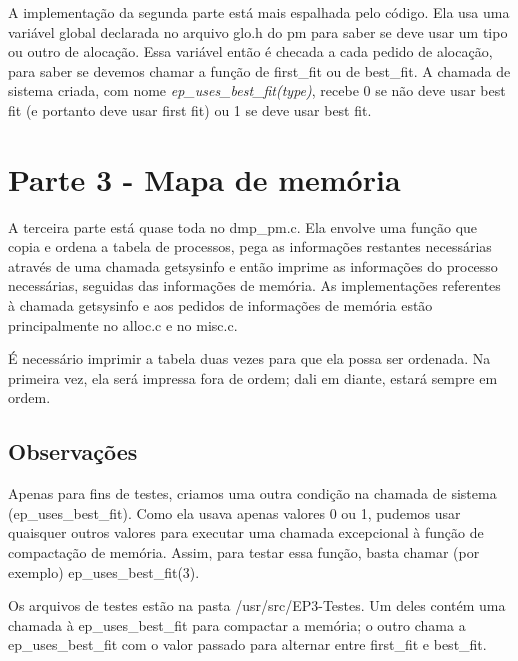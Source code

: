\documentclass[11pt]{article}
\begin{document}
    A implementação da segunda parte está mais espalhada pelo código. Ela usa uma variável global declarada no arquivo glo.h do pm para saber se deve usar um tipo ou outro de alocação. Essa variável então é checada a cada pedido de alocação, para saber se devemos chamar a função de first\_fit ou de best\_fit. A chamada de sistema criada, com nome \textit{ep\_uses\_best\_fit(type)}, recebe 0 se não deve usar best fit (e portanto deve usar first fit) ou 1 se deve usar best fit.

    \section*{Parte 3 - Mapa de memória}

    A terceira parte está quase toda no dmp\_pm.c. Ela envolve uma função que copia e ordena a tabela de processos, pega as informações restantes necessárias através de uma chamada getsysinfo e então imprime as informações do processo necessárias, seguidas das informações de memória. As implementações referentes à chamada getsysinfo e aos pedidos de informações de memória estão principalmente no alloc.c e no misc.c.

    É necessário imprimir a tabela duas vezes para que ela possa ser ordenada. Na primeira vez, ela será impressa fora de ordem; dali em diante, estará sempre em ordem.


    \subsection*{Observações}
    Apenas para fins de testes, criamos uma outra condição na chamada de sistema (ep\_uses\_best\_fit). Como ela usava apenas valores 0 ou 1, pudemos usar quaisquer outros valores para executar uma chamada excepcional à função de compactação de memória. Assim, para testar essa função, basta chamar (por exemplo) ep\_uses\_best\_fit(3).

    Os arquivos de testes estão na pasta /usr/src/EP3-Testes. Um deles contém uma chamada à ep\_uses\_best\_fit para compactar a memória; o outro chama a ep\_uses\_best\_fit com o valor passado para alternar entre first\_fit e best\_fit.
\end{document}
